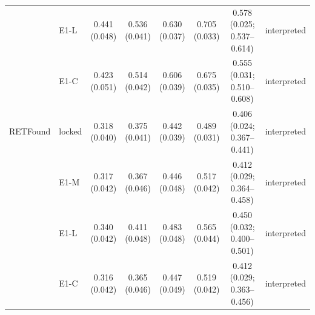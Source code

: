 \begin{longtable}{@{}p{3.6cm}lcccccp{2.6cm}@{}}
 & E1-L & \makecell{0.441\\{\scriptsize (0.048)}} & \makecell{0.536\\{\scriptsize (0.041)}} & \makecell{0.630\\{\scriptsize (0.037)}} & \makecell{0.705\\{\scriptsize (0.033)}} & \makecell{0.578\\{\scriptsize (0.025; 0.537--0.614)}} & interpreted \\
 & E1-C & \makecell{0.423\\{\scriptsize (0.051)}} & \makecell{0.514\\{\scriptsize (0.042)}} & \makecell{0.606\\{\scriptsize (0.039)}} & \makecell{0.675\\{\scriptsize (0.035)}} & \makecell{0.555\\{\scriptsize (0.031; 0.510--0.608)}} & interpreted \\
\addlinespace[2pt]
RETFound & locked & \makecell{0.318\\{\scriptsize (0.040)}} & \makecell{0.375\\{\scriptsize (0.041)}} & \makecell{0.442\\{\scriptsize (0.039)}} & \makecell{0.489\\{\scriptsize (0.031)}} & \makecell{0.406\\{\scriptsize (0.024; 0.367--0.441)}} & interpreted \\
 & E1-M & \makecell{0.317\\{\scriptsize (0.042)}} & \makecell{0.367\\{\scriptsize (0.046)}} & \makecell{0.446\\{\scriptsize (0.048)}} & \makecell{0.517\\{\scriptsize (0.042)}} & \makecell{0.412\\{\scriptsize (0.029; 0.364--0.458)}} & interpreted \\
 & E1-L & \makecell{0.340\\{\scriptsize (0.042)}} & \makecell{0.411\\{\scriptsize (0.048)}} & \makecell{0.483\\{\scriptsize (0.048)}} & \makecell{0.565\\{\scriptsize (0.044)}} & \makecell{0.450\\{\scriptsize (0.032; 0.400--0.501)}} & interpreted \\
 & E1-C & \makecell{0.316\\{\scriptsize (0.042)}} & \makecell{0.365\\{\scriptsize (0.046)}} & \makecell{0.447\\{\scriptsize (0.049)}} & \makecell{0.519\\{\scriptsize (0.042)}} & \makecell{0.412\\{\scriptsize (0.029; 0.363--0.456)}} & interpreted \\

\end{longtable}
